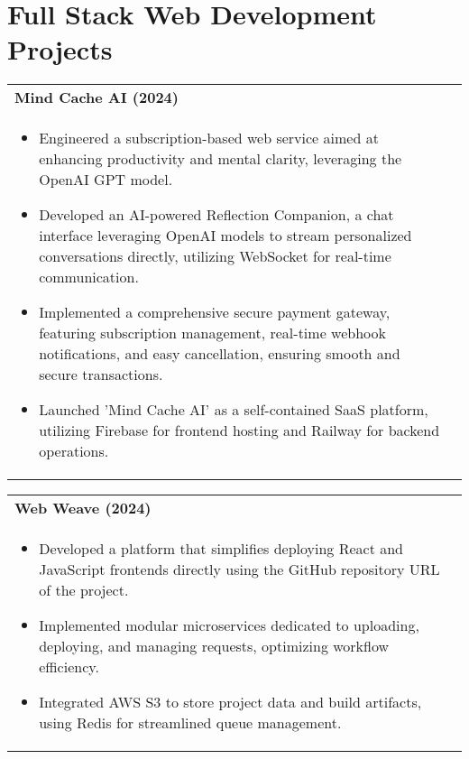 \documentclass[a4paper,8pt]{article}
\begin{document}
\section{Full Stack Web Development Projects}
\begin{tabularx}{\linewidth}{ @{}l r@{} }
\textbf{{Mind Cache AI (2024)}} \hfill \color[HTML]{371e77} \\[1pt]
\begin{minipage}[t]{\linewidth}
    \begin{itemize}[nosep,after=\strut, leftmargin=2em, itemsep=2pt]
        \item Engineered a subscription-based web service aimed at enhancing productivity and mental clarity, leveraging the OpenAI GPT model.
        \item Developed an AI-powered Reflection Companion, a chat interface leveraging OpenAI models to stream personalized conversations directly, utilizing WebSocket for real-time communication.
        \item Implemented a comprehensive secure payment gateway, featuring subscription management, real-time webhook notifications, and easy cancellation, ensuring smooth and secure transactions.
        \item Launched 'Mind Cache AI' as a self-contained SaaS platform, utilizing Firebase for frontend hosting and Railway for backend operations.
    \end{itemize}
\end{minipage}
\end{tabularx}

\begin{tabularx}{\linewidth}{ @{}l r@{} }
\textbf{{Web Weave (2024)}} \hfill \color[HTML]{371e77} \\[1pt]
\begin{minipage}[t]{\linewidth}
    \begin{itemize}[nosep,after=\strut, leftmargin=2em, itemsep=2pt]
        \item Developed a platform that simplifies deploying React and JavaScript frontends directly using the GitHub repository URL of the project.
        \item Implemented modular microservices dedicated to uploading, deploying, and managing requests, optimizing workflow efficiency.
        \item Integrated AWS S3 to store project data and build artifacts, using Redis for streamlined queue management.
\end{itemize}
\end{minipage}
\end{tabularx}
\end{document}
